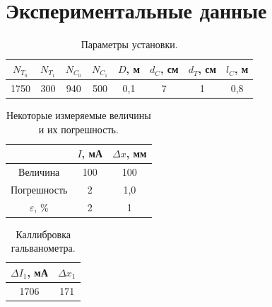 \documentclass[a4paper,12pt]{article} %
\begin{document}
\section{Экспериментальные данные}

		
	\begin{table}[H]
		\caption{Параметры установки.}
		\label{table:const}
		\begin{tabular}{|c|c|c|c|c|c|c|c|}
			\hline
			$N_{T_0}$ & $N_{T_1}$ & $N_{C_0}$ & $N_{C_1}$ & $D$, м & $d_C$, см & $d_T$, см & $l_C$, м \\ \hline
			1750      & 300       & 940       & 500       & 0,1    & 7         & 1         & 0,8      \\ \hline
		\end{tabular}
	\end{table}


	\begin{table}[H]
		\caption{Некоторые измеряемые величины и их погрешность.}
		\label{table:error}
		\begin{tabular}{|c|c|c|}
			\hline
			& $I$, мА & $\Delta x$, мм \\ \hline
			Величина          & 100     & 100            \\ \hline
			Погрешность       & 2       & 1,0            \\ \hline
			$\varepsilon$, \% & 2       & 1              \\ \hline
		\end{tabular}
	\end{table}


	\begin{table}[H]
		\caption{Каллибровка гальванометра.}
		\label{table:calc}
		\begin{tabular}{|c|c|}
			\hline
			$\Delta I_1$, мА & $\Delta x_1$ \\ \hline
			1706             & 171          \\ \hline
		\end{tabular}
	\end{table}
\end{document}
